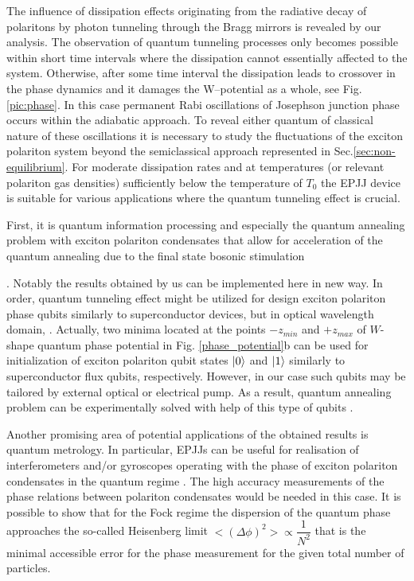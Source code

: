 \documentclass[aps, pre, preprint, groupedaddress, superscriptaddress, showkeys, showpacs] {revtex4-1}
\DeclarePairedDelimiter\ket{\lvert}{\rangle}
\begin{document}
{{{The influence of dissipation effects originating from the radiative decay of polaritons by photon tunneling through the Bragg mirrors is revealed by our analysis.
The observation of quantum tunneling processes only becomes possible within short time intervals where the dissipation cannot essentially affected to the system.
Otherwise, after some time interval the dissipation leads to crossover in the phase dynamics and it damages the W--potential as a whole, see Fig. \ref{pic:phase}.
In this case permanent Rabi  oscillations of Josephson junction phase occurs within the adiabatic approach.
To reveal either quantum of classical nature of these oscillations it is necessary to study the fluctuations of the exciton polariton system beyond the semiclassical approach represented in Sec.\ref{sec:non-equilibrium}}. 
For moderate dissipation rates and at temperatures (or relevant polariton gas densities) sufficiently below the temperature of $T_{0}$ the EPJJ device is suitable for various applications where the quantum tunneling effect is crucial. 

First, it is quantum information processing and especially the quantum annealing problem  with exciton polariton condensates that allow for acceleration of the quantum annealing due to the final state bosonic stimulation {\cite{Yan}. Notably the results obtained by us can be implemented  here in new way.  In order, quantum tunneling effect might be utilized  for design exciton polariton phase qubits similarly to superconductor devices, but in optical wavelength domain, \cite{Makhlin}. Actually,  two minima located at the points $-z_{min}$ and $+z_{max}$ of $W$-shape quantum phase potential in Fig. \ref{phase_potential}b can be used for initialization of exciton polariton qubit states $\ket{0}$ and $\ket{1}$ similarly to superconductor flux qubits, respectively. However, in our case such qubits may be tailored by external optical or electrical pump. As a result, quantum annealing problem can be experimentally solved   
with help of this type of qubits \cite{Johnson}.  
 
Another promising area of potential applications of the obtained results is quantum metrology.
In particular, EPJJs can be useful for realisation of interferometers and/or gyroscopes operating with the phase of  exciton polariton condensates in the quantum regime \cite{Pezze, Gulevich}.
The high accuracy measurements of the phase relations between polariton condensates would be needed in this case.
It is possible to show that for the Fock regime the dispersion of the quantum phase approaches the so-called Heisenberg limit ${<(\Delta\phi)^2> \propto \dfrac{1}{N^2}}$ that is the minimal accessible error for the phase measurement for the given total number of particles.

}}}
\end{document}
